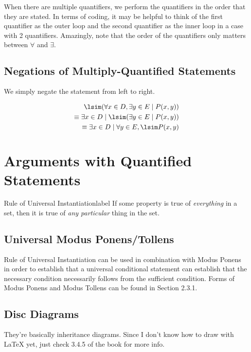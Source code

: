 \documentclass[a4paper]{report}
\begin{document}
When there are multiple quantifiers, we perform the quantifiers in the order that they are stated. In terms of coding, it may be helpful to think
of the first quantifier as the outer loop and the second quantifier as the inner loop in a case with 2 quantifiers.
Amazingly, note that the order of the quantifiers only matters between $\forall $ and $\exists $.

\subsection{Negations of Multiply-Quantified Statements}

We simply negate the statement from left to right.

\begin{align}
    \lsim (\forall x \in D, \exists y \in E  \mid P(x, y)) \\
    \equiv \exists x \in D  \mid \lsim (\exists y \in E  \mid P(x, y)) \\
    \equiv \exists x \in D  \mid \forall y \in E, \lsim P(x, y)
\end{align}

\section{Arguments with Quantified Statements}

\begin{definition}{Rule of Universal Instantiation}{label}
    If some property is true of \emph{everything} in a set, then it is true of \emph{any particular} thing in the set.
\end{definition}

\subsection{Universal Modus Ponens/Tollens}

Rule of Universal Instantiation can be used in combination with Modus Ponens in order to establish that a universal conditional statement can establish
that the necessary condition necessarily follows from the sufficient condition.
Forms of Modus Ponens and Modus Tollens can be found in Section 2.3.1.

\subsection{Disc Diagrams}

They're basically inheritance diagrams. Since I don't know how to draw with LaTeX yet, just check 3.4.5 of the book for more info.
\end{document}
